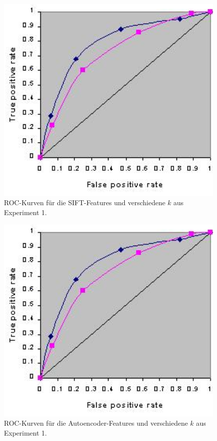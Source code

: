 \begin{figure}
	\centering
	\includegraphics[scale=0.4]{images/roc_ph.png}
	\caption{ROC-Kurven für die SIFT-Features und verschiedene $k$ aus Experiment 1.}
	\label{img:roc1}
\end{figure}

\begin{figure}
	\centering
	\includegraphics[scale=0.4]{images/roc_ph.png}
	\caption{ROC-Kurven für die Autoencoder-Features und verschiedene $k$ aus Experiment 1.}
	\label{img:roc2}
\end{figure}

